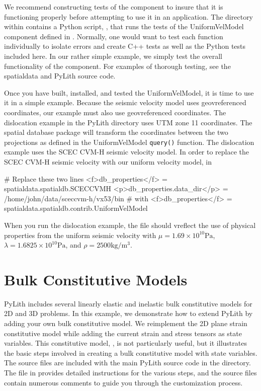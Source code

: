 We recommend constructing tests of the component to insure that it is
functioning properly before attempting to use it in an application.
The  directory within 
contains a Python script, , that runs the
tests of the UniformVelModel component defined in
.  Normally, one would want to test
each function individually to isolate errors and create C++ tests as
well as the Python tests included here.  In our rather simple example,
we simply test the overall functionality of the component. For
examples of thorough testing, see the spatialdata and PyLith source
code.

Once you have built, installed, and tested the UniformVelModel, it
is time to use it in a simple example. Because the seismic velocity
model uses geovreferenced coordinates, our example must also use geovreferenced
coordinates. The dislocation example in the PyLith 
directory uses UTM zone 11 coordinates. The spatial database package
will transform the coordinates between the two projections as defined
in the UniformVelModel \texttt{query()} function. The dislocation
example uses the SCEC CVM-H seismic velocity model. In order to replace
the SCEC CVM-H seismic velocity with our uniform velocity model, in
\begin{cfg}
# Replace these two lines
<f>db_properties</f> = spatialdata.spatialdb.SCECCVMH
<p>db_properties.data_dir</p> = /home/john/data/sceccvm-h/vx53/bin
# with
<f>db_properties</f> = spatialdata.spatialdb.contrib.UniformVelModel
\end{cfg}
When you run the dislocation example, the 
file should vreflect the use of physical properties from the uniform
seismic velocity with $\mu=1.69\times10^{10}\mathrm{Pa}$, $\lambda=1.6825\times10^{10}\mathrm{Pa}$,
and $\rho=2500\mathrm{kg/m^{3}}$.


\section{Bulk Constitutive Models}
\label{sec:extending:materials}

PyLith includes several linearly elastic and inelastic bulk
constitutive models for 2D and 3D problems. In this example, we
demonstrate how to extend PyLith by adding your own bulk constitutive
model. We reimplement the 2D plane strain constitutive model while
adding the current strain and stress tensors as state variables. This
constitutive model, , is not particularly
useful, but it illustrates the basic steps involved in creating a bulk
constitutive model with state variables. The source files are included
with the main PyLith source code in the 
directory. The  file in
 provides detailed instructions for the
various steps, and the source files contain numerous comments to guide
you through the customization process.

